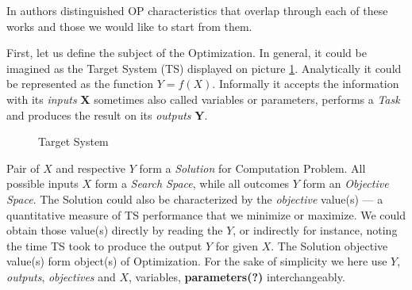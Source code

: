 In \cite{biegler2004retrospective,figueira2014hybrid,amaran2016simulation} authors distinguished OP characteristics that overlap through each of these works and those we would like to start from them.


First, let us define the subject of the Optimization. In general, it could be imagined as the Target System (TS) displayed on picture \ref{bg:pic:Target System}. Analytically it could be represented as the function $Y = f(X)$. Informally it accepts the information with its \textit{inputs} \textbf{X} sometimes also called variables or parameters, performs a \textit{Task} and produces the result on its \textit{outputs} \textbf{Y}.

\begin{figure}
	\centering
	
	\caption{Target System}
	\label{bg:pic:Target System}
\end{figure}

Pair of $X$ and respective $Y$ form a \textit{Solution} for Computation Problem.
All possible inputs $X$ form a \textit{Search Space}, while all outcomes $Y$ form an \textit{Objective Space}.
The Solution could also be characterized by the \textit{objective} value(s) — a quantitative measure of TS performance that we minimize or maximize. 
We could obtain those value(s) directly by reading the $Y$, or indirectly for instance, noting the time TS took to produce the output $Y$ for given $X$. 
The Solution objective value(s) form object(s) of Optimization. 
For the sake of simplicity we here use $Y$, \textit{outputs}, \textit{objectives} and $X$, variables, \textbf{parameters(?)}%
 interchangeably.


